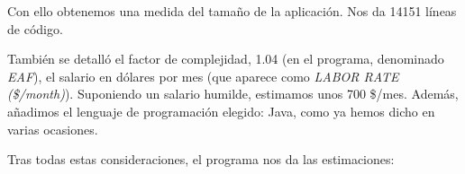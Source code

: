 \documentclass[spanish,a4paper,11pt, twoside]{report}	%
\begin{document}
\vspace{0.35cm}
\hspace{2.9cm}
\vspace{0.35cm}

Con ello obtenemos una medida del tamaño de la aplicación. Nos da 14151 líneas de código.

También se detalló el factor de complejidad, 1.04 (en el programa, denominado \textit{EAF}), el salario en dólares por mes (que aparece como \textit{LABOR RATE (\$/month)}). Suponiendo un salario humilde, estimamos unos 700 \$/mes. Además, añadimos el lenguaje de programación elegido: Java, como ya hemos dicho en varias ocasiones. 


\vspace{0.35cm}
\hspace{-2.8cm}
\vspace{0.35cm}

Tras todas estas consideraciones, el programa nos da las estimaciones:
\end{document}
